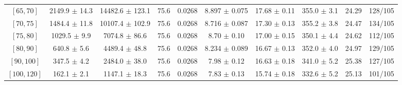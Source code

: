 \begin{tabular}{c||c|c|c|c|c|c|c||c|c}
$[65, 70]$ & 2149.9 $\pm$ 14.3 & 14482.6 $\pm$ 123.1 & 75.6 & 0.0268 & 8.897 $\pm$ 0.075 & 17.68 $\pm$ 0.11 & 355.0 $\pm$ 3.1 & 24.29 & 128/105\\
$[70, 75]$ & 1484.4 $\pm$ 11.8 & 10107.4 $\pm$ 102.9 & 75.6 & 0.0268 & 8.716 $\pm$ 0.087 & 17.30 $\pm$ 0.13 & 355.2 $\pm$ 3.8 & 24.47 & 134/105\\
$[75, 80]$ & 1029.5 $\pm$ 9.9 & 7074.8 $\pm$ 86.6 & 75.6 & 0.0268 & 8.70 $\pm$ 0.10 & 17.00 $\pm$ 0.15 & 350.1 $\pm$ 4.4 & 24.62 & 112/105\\
$[80, 90]$ & 640.8 $\pm$ 5.6 & 4489.4 $\pm$ 48.8 & 75.6 & 0.0268 & 8.234 $\pm$ 0.089 & 16.67 $\pm$ 0.13 & 352.0 $\pm$ 4.0 & 24.97 & 129/105\\
$[90, 100]$ & 347.5 $\pm$ 4.2 & 2484.0 $\pm$ 38.0 & 75.6 & 0.0268 & 7.98 $\pm$ 0.12 & 16.63 $\pm$ 0.18 & 341.0 $\pm$ 5.2 & 25.38 & 127/105\\
$[100, 120]$ & 162.1 $\pm$ 2.1 & 1147.1 $\pm$ 18.3 & 75.6 & 0.0268 & 7.83 $\pm$ 0.13 & 15.74 $\pm$ 0.18 & 332.6 $\pm$ 5.2 & 25.13 & 101/105\\
\end{tabular}
